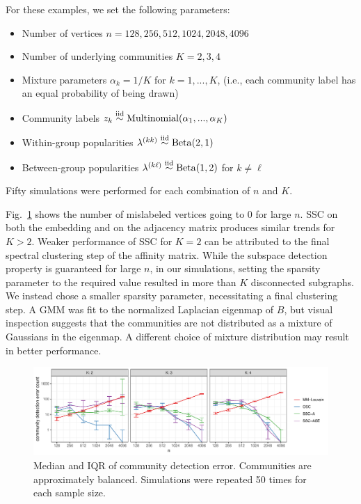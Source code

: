 \documentclass[12pt]{article}
\providecommand{\tightlist}{%
  \setlength{\itemsep}{0pt}\setlength{\parskip}{0pt}}
\begin{document}
For these examples, we set the following parameters:

\begin{itemize}
\tightlist
\item
  Number of vertices \(n = 128, 256, 512, 1024, 2048, 4096\)
\item
  Number of underlying communities \(K = 2, 3, 4\)
\item
  Mixture parameters \(\alpha_k = 1 / K\) for \(k = 1, ..., K\), (i.e.,
  each community label has an equal probability of being drawn)
\item
  Community labels
  \(z_k \stackrel{\text{iid}}{\sim} \mathrm{Multinomial}(\alpha_1, ..., \alpha_K)\)
\item
  Within-group popularities
  \(\lambda^{(kk)} \stackrel{\text{iid}}{\sim} \mathrm{Beta}(2, 1)\)
\item
  Between-group popularities
  \(\lambda^{(k \ell)} \stackrel{\text{iid}}{\sim} \mathrm{Beta}(1, 2)\) for
  \(k \neq \ell\)
\end{itemize}
Fifty simulations were performed for each combination of $n$ and $K$.

Fig.~\ref{fig:clust_err_ct_sim} shows the number of mislabeled vertices
going to 0 for large \(n\). SSC on both the embedding and on the
adjacency matrix produces similar trends for \(K > 2\). Weaker
performance of SSC for \(K = 2\) can be attributed to the final spectral
clustering step of the affinity matrix. 
While the subspace detection property is guaranteed for large \(n\), in our
simulations, setting the sparsity parameter to the required value resulted
in more than \(K\) disconnected subgraphs. 
We instead chose a smaller sparsity parameter, 
necessitating a final clustering step. 
A GMM was fit to the normalized Laplacian eigenmap of $B$,
but visual inspection suggests that the communities are not
distributed as a mixture of Gaussians in the eigenmap. 
A different choice of mixture distribution may result in better performance. 

\begin{figure}[H]

{\centering \includegraphics{summary_files/figure-latex/clust_err_ct_sim-1}

}

\caption{Median and IQR of community detection error. Communities are approximately balanced. Simulations were repeated 50 times for each sample size.}\label{fig:clust_err_ct_sim}
\end{figure}
\end{document}
